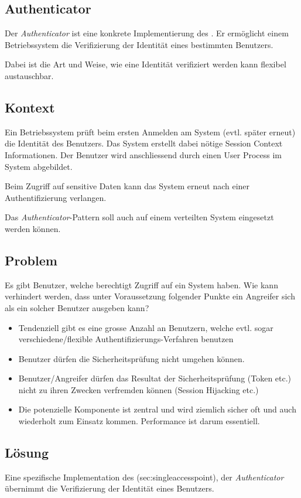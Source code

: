 \subsection{Authenticator}

Der \emph{Authenticator} ist eine konkrete Implementierung des . Er ermöglicht einem Betriebssystem die Verifizierung der Identität eines bestimmten Benutzers.

Dabei ist die Art und Weise, wie eine Identität verifiziert werden kann flexibel austauschbar.


\subsection*{Kontext}
Ein Betriebssystem prüft beim ersten Anmelden am System (evtl. später erneut) die Identität des Benutzers. Das System erstellt dabei nötige Session Context Informationen. Der Benutzer wird anschliessend durch einen User Process im System abgebildet.

Beim Zugriff auf sensitive Daten kann das System erneut nach einer Authentifizierung verlangen.

Das \emph{Authenticator}-Pattern soll auch auf einem verteilten System eingesetzt werden können.


\subsection*{Problem}
Es gibt Benutzer, welche berechtigt Zugriff auf ein System haben. Wie kann verhindert werden, dass unter Voraussetzung folgender Punkte ein Angreifer sich als ein solcher Benutzer ausgeben kann?

\begin{itemize}
	\item Tendenziell gibt es eine grosse Anzahl an Benutzern, welche evtl. sogar verschiedene/flexible Authentifizierungs-Verfahren benutzen
	\item Benutzer dürfen die Sicherheitsprüfung nicht umgehen können.
	\item Benutzer/Angreifer dürfen das Resultat der Sicherheitsprüfung (Token etc.) nicht zu ihren Zwecken verfremden können (Session Hijacking etc.)
	\item Die potenzielle Komponente ist zentral und wird ziemlich sicher oft und auch wiederholt zum Einsatz kommen. Performance ist darum essentiell.
\end{itemize}


\subsection*{Lösung}
Eine spezifische Implementation des \nameref(sec:singleaccesspoint), der \emph{Authenticator} übernimmt die Verifizierung der Identität eines Benutzers.


